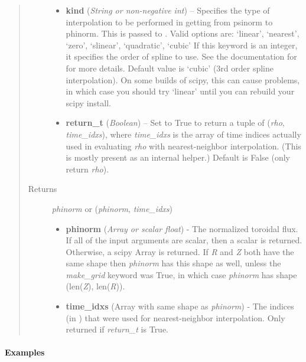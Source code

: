 \documentclass[letterpaper,10pt,english]{sphinxmanual}
\begin{document}
\begin{fulllineitems}
\begin{fulllineitems}
\begin{quote}
\begin{description}
\begin{itemize}
\item {} 
\textbf{kind} (\emph{String or non-negative int}) --
Specifies the type of
interpolation to be performed in getting from psinorm to
phinorm. This is passed to
. Valid options are:
`linear', `nearest', `zero', `slinear', `quadratic', `cubic'
If this keyword is an integer, it specifies the order of spline
to use. See the documentation for  for more
details. Default value is `cubic' (3rd order spline
interpolation). On some builds of scipy, this can cause problems,
in which case you should try `linear' until you can rebuild your
scipy install.

\item {} 
\textbf{return\_t} (\emph{Boolean}) --
Set to True to return a tuple of (\emph{rho},
\emph{time\_idxs}), where \emph{time\_idxs} is the array of time indices
actually used in evaluating \emph{rho} with nearest-neighbor
interpolation. (This is mostly present as an internal helper.)
Default is False (only return \emph{rho}).

\end{itemize}

\item[{Returns}] \leavevmode

\emph{phinorm} or (\emph{phinorm}, \emph{time\_idxs})
\begin{itemize}
\item {} 
\textbf{phinorm} (\emph{Array or scalar float}) - The normalized toroidal
flux. If all of the input arguments are scalar, then a scalar is
returned. Otherwise, a scipy Array is returned. If \emph{R} and \emph{Z}
both have the same shape then \emph{phinorm} has this shape as well,
unless the \emph{make\_grid} keyword was True, in which case \emph{phinorm}
has shape (len(\emph{Z}), len(\emph{R})).

\item {} 
\textbf{time\_idxs} (Array with same shape as \emph{phinorm}) - The indices
(in ) that were used for
nearest-neighbor interpolation. Only returned if \emph{return\_t} is
True.

\end{itemize}


\end{description}\end{quote}
\paragraph{Examples}


\end{fulllineitems}
\end{fulllineitems}
\end{document}
